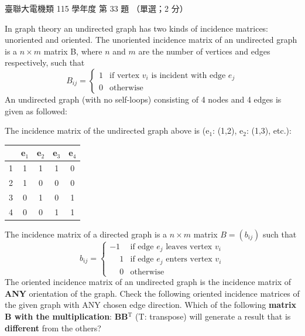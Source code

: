 \begin{pastexam}[label={px:ust-115-ee-ds-33}]{臺聯大電機類 115 學年度 第 33 題}
（單選；2 分）

In graph theory an undirected graph has two kinds of incidence matrices: unoriented and oriented.
The unoriented incidence matrix of an undirected graph is a $n\times m$ matrix B, where $n$ and $m$
are the number of vertices and edges respectively, such that
\[ B_{ij}=\begin{cases}1 & \text{if vertex } v_i \text{ is incident with edge } e_j\\ 0 &
\text{otherwise}\end{cases} \]
An undirected graph (with no self-loops) consisting of 4 nodes and 4 edges is given as followed:

\begin{center}
\end{center}

The incidence matrix of the undirected graph above is (e$_1$: (1,2), e$_2$: (1,3), etc.):

\begin{center}
\begin{tabular}{|c|c|c|c|c|}\hline
  & e$_1$ & e$_2$ & e$_3$ & e$_4$\\\hline
1 & 1 & 1 & 1 & 0\\\hline
2 & 1 & 0 & 0 & 0\\\hline
3 & 0 & 1 & 0 & 1\\\hline
4 & 0 & 0 & 1 & 1\\\hline
\end{tabular}
\end{center}

The incidence matrix of a directed graph is a $n\times m$ matrix $B=(b_{ij})$ such that
\[ b_{ij}=\begin{cases}-1 & \text{if edge } e_j \text{ leaves vertex } v_i\\ \phantom{-}1 &
\text{if edge } e_j \text{ enters vertex } v_i\\ \phantom{-}0 & \text{otherwise}\end{cases} \]
The oriented incidence matrix of an undirected graph is the incidence matrix of \textbf{ANY}
orientation of the graph. Check the following oriented incidence matrices of the given graph with
ANY chosen edge direction. Which of the following \textbf{matrix B with the multiplication}:
\textbf{BB$^{\mathrm{T}}$} (T: transpose) will generate a result that is \textbf{different} from the
others?


\end{pastexam}
